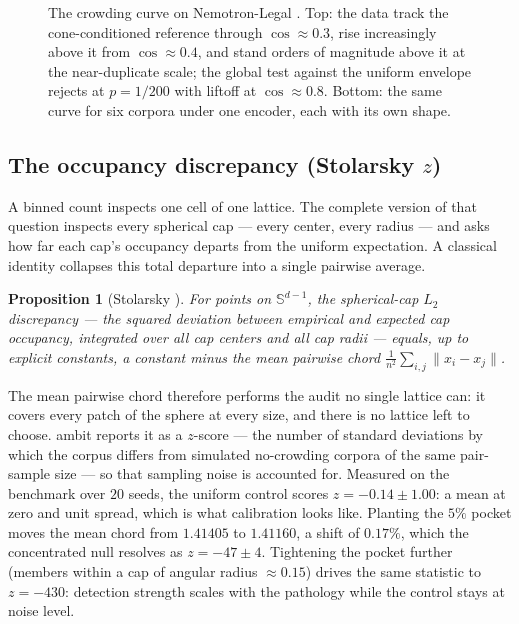 \documentclass[11pt,letterpaper]{article}
\newtheorem{proposition}{Proposition}
\newcommand{\sphere}{\mathbb{S}^{d-1}}
\begin{document}
\begin{figure}[t]
\caption{The crowding curve on Nemotron-Legal \cite{nemotronlegal}.
Top: the data track the cone-conditioned reference through
$\cos \approx 0.3$, rise increasingly above it from
$\cos \approx 0.4$, and stand orders of magnitude above it at the
near-duplicate scale; the global test against the uniform envelope
rejects at $p = 1/200$ with liftoff at $\cos \approx 0.8$. Bottom: the
same curve for six corpora under one encoder, each with its own shape.}
\label{fig:kcurve}
\end{figure}

\subsection{The occupancy discrepancy (Stolarsky $z$)}

A binned count inspects one cell of one lattice. The complete version
of that question inspects every spherical cap --- every center, every
radius --- and asks how far each cap's occupancy departs from the
uniform expectation. A classical identity collapses this total departure
into a single pairwise average.

\begin{proposition}[Stolarsky \cite{stolarsky1973}]
For points on $\sphere$, the spherical-cap $L_2$ discrepancy --- the squared
deviation between empirical and expected cap occupancy, integrated over
\emph{all} cap centers and \emph{all} cap radii --- equals, up to explicit
constants, a constant minus the mean pairwise chord
$\frac{1}{n^2}\sum_{i,j}\lVert x_i - x_j\rVert$.
\end{proposition}

The mean pairwise chord therefore performs the audit no single lattice
can: it covers every patch of the sphere at every size, and there is no
lattice left to choose. \textsf{ambit} reports it as a $z$-score --- the number of standard
deviations by which the corpus differs from simulated no-crowding
corpora of the same pair-sample size --- so that sampling noise is
accounted for.
Measured on the benchmark over $20$ seeds, the uniform control scores
$z = -0.14 \pm 1.00$: a mean at zero and unit spread, which is what
calibration looks like. Planting the $5\%$ pocket moves the mean chord
from $1.41405$ to $1.41160$, a shift of $0.17\%$, which the concentrated
null resolves as $z = -47 \pm 4$. Tightening
the pocket further (members within a cap of angular radius $\approx 0.15$)
drives the same statistic to $z = -430$: detection strength scales with the
pathology while the control stays at noise level.
\end{document}

